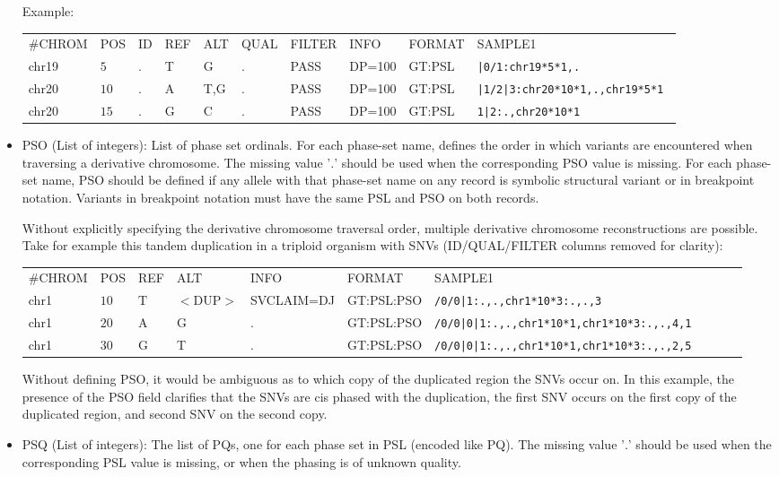 \documentclass[8pt]{article}
\begin{document}
\begin{itemize}
  Example:

  \vspace{0.5em}
  \begin{tabular}{ l l l l l l l l l l}
    \#CHROM & POS & ID & REF & ALT & QUAL & FILTER & INFO & FORMAT & SAMPLE1\\
     chr19 & $5$ & . & T & G & . & PASS & DP=100 &GT:PSL & \tt{|0/1:chr19*5*1,.}\\
    chr20 & $10$ & . & A & T,G & . & PASS & DP=100 &GT:PSL & \tt{|1/2|3:chr20*10*1,.,chr19*5*1} \\
    chr20 & $15$ & . & G & C & . & PASS & DP=100 &GT:PSL & \tt{1|2:.,chr20*10*1}\\
  \end{tabular}

  \item PSO (List of integers): List of phase set ordinals.
  For each phase-set name, defines the order in which variants are encountered when traversing a derivative chromosome.
  The missing value '$.$' should be used when the corresponding PSO value is missing.
  For each phase-set name, PSO should be defined if any allele with that phase-set name on any record is symbolic structural variant or in breakpoint notation.
  Variants in breakpoint notation must have the same PSL and PSO on both records.

  Without explicitly specifying the derivative chromosome traversal order, multiple derivative chromosome reconstructions are possible.
  Take for example this tandem duplication in a triploid organism with SNVs (ID/QUAL/FILTER columns removed for clarity):

  \vspace{0.5em}
  \begin{tabular}{ l l l l l l l l l l}
  \#CHROM & POS & REF & ALT & INFO & FORMAT & SAMPLE1\\
    chr1 & $10$ & T & $<$DUP$>$ & SVCLAIM=DJ & GT:PSL:PSO & \tt{/0/0|1:.,.,chr1*10*3:.,.,3}\\
    chr1 & $20$ & A & G & . & GT:PSL:PSO & \tt{/0/0|0|1:.,.,chr1*10*1,chr1*10*3:.,.,4,1} \\
    chr1 & $30$ & G & T & . & GT:PSL:PSO & \tt{/0/0|0|1:.,.,chr1*10*1,chr1*10*3:.,.,2,5} \\
  \end{tabular}

  Without defining PSO, it would be ambiguous as to which copy of the duplicated region the SNVs occur on.
  In this example, the presence of the PSO field clarifies that the SNVs are cis phased with the duplication, the first SNV occurs on the first copy of the duplicated region, and second SNV on the second copy.

  \item PSQ (List of integers): The list of PQs, one for each phase set in PSL (encoded like PQ).
  The missing value '$.$' should be used when the corresponding PSL value is missing, or when the phasing is of unknown quality.
\end{itemize}
\end{document}
